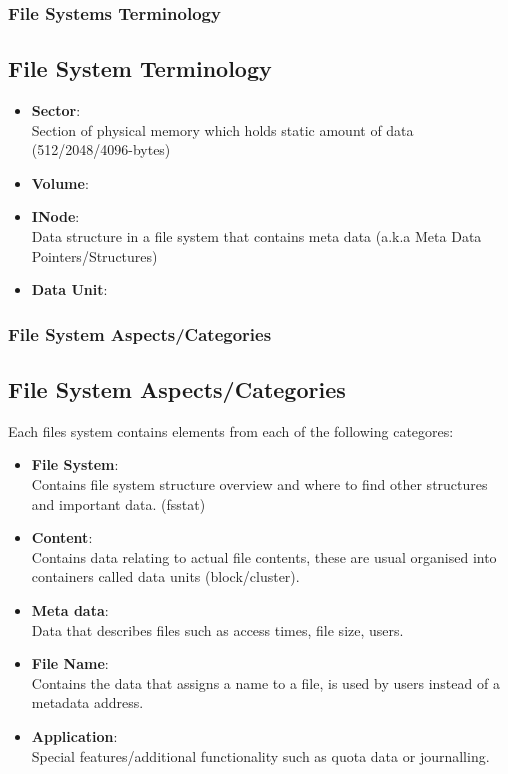 \documentclass{beamer}
\begin{document}
\begin{frame}
	\frametitle{File Systems Terminology}
	\subsection*{File System Terminology}
	\begin{itemize}
		\item{\textbf{Sector}}:\\ Section of physical memory which holds static amount of data (512/2048/4096-bytes)
		\item\textbf{Volume}:\\ 
		\item\textbf{INode}:\\ Data structure in a file system that contains meta data (a.k.a Meta Data Pointers/Structures)
		\item\textbf{Data Unit}:\\
	\end{itemize}
\end{frame}

\begin{frame}
	\frametitle{File System Aspects/Categories}
	\subsection*{File System Aspects/Categories}
	Each files system contains elements from each of the following categores:
	\begin{itemize}
		\item \textbf{File System}: \\ Contains file system structure overview and where to find other structures and important data. (fsstat)
		\item \textbf{Content}: \\ Contains data relating to actual file contents, these are usual organised into containers called data units (block/cluster).
		\item \textbf{Meta data}: \\ Data that describes files such as access times, file size, users.
		\item \textbf{File Name}: \\ Contains the data that assigns a name to a file, is used by users instead of a metadata address.
		\item \textbf{Application}: \\ Special features/additional functionality such as quota data or journalling.	
	\end{itemize}	    
\end{frame}
\end{document}
